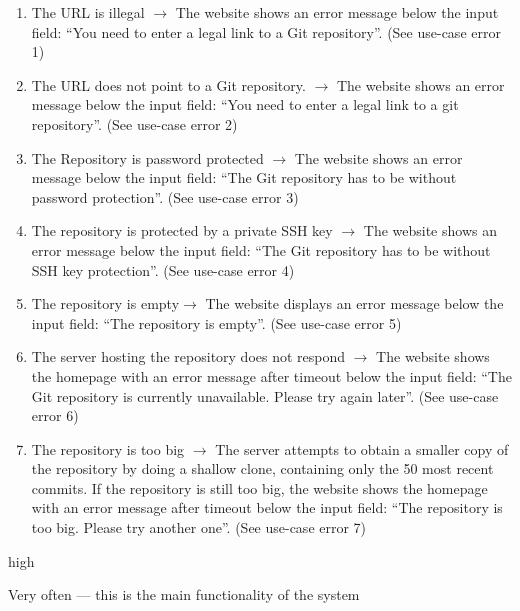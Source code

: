 \documentclass[11pt]{scrartcl}
\begin{document}
\begin{description}[leftmargin=!,labelwidth=\widthof{\bfseries Frequency of use:}]
	\item[Exceptions:]
		\begin{enumerate}[leftmargin=1.5em]
			\item The URL is illegal $\rightarrow$ The website shows an error message below the 						input field: \enquote{You need to enter a legal link to a Git repository}. (See use-case 				error 1)
			\item The URL does not point to a Git repository. $\rightarrow$  The website
				shows an error message below the input field: \enquote{You need to enter a legal 		
				link to a git repository}. (See use-case error 2)
			\item The Repository is password protected $\rightarrow$ The website shows an
				error message below the input field: \enquote{The Git repository has to be without 
				password protection}. (See use-case error 3)
			\item The repository is protected by a private SSH key $\rightarrow$ The
				website shows an error message below the input field: \enquote{The Git repository 
				has to be without SSH key protection}. (See use-case error 4)
			\item The repository is empty$\rightarrow$ The website displays an error
				message below the input field: \enquote{The repository is empty}. (See use-case 
				error 5)
			\item The server hosting the repository does not respond $\rightarrow$ The
				website shows the homepage with an error message after timeout below the input 	
				field: 	\enquote{The Git repository is currently unavailable. Please try again later}.  
				(See use-case error 6)
			\item The repository is too big $\rightarrow$  The server attempts to obtain a
				smaller copy of the repository by doing a shallow clone, containing only
				the 50 most recent commits. If the repository is still too big, the
				website shows the homepage with an error message after timeout below the input 	
				field: \enquote{The repository is too big. Please try another one}. (See use-case 	
				error 7)
		\end{enumerate}

	\item[Priority:] high
	\item[Frequency of use:] Very often --- this is the main functionality of the system

\end{description}
\end{document}
